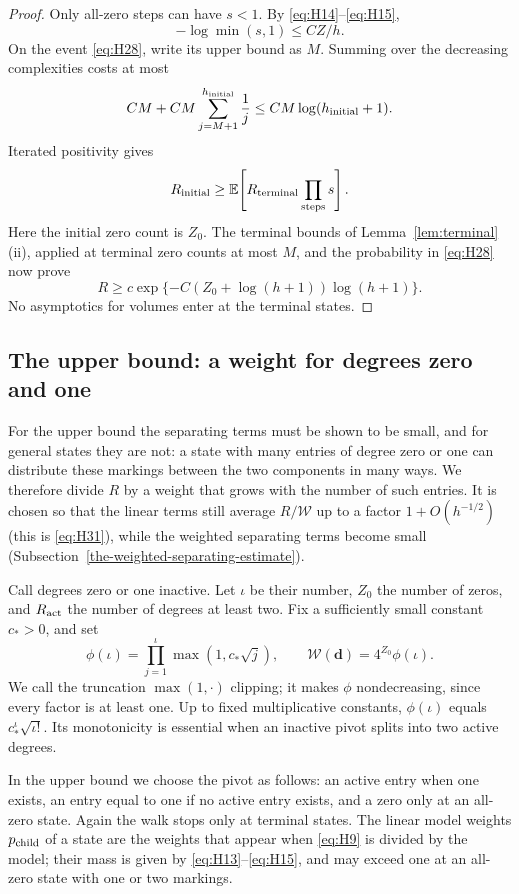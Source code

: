\begin{proof}
Only all-zero steps can have \(s<1\). By \eqref{eq:H14}--\eqref{eq:H15}, \[
-\log\min(s,1)\le CZ/h.
\] On the event \eqref{eq:H28}, write its upper bound as \(M\). Summing over the
decreasing complexities costs at most \[
CM+CM\sum_{j=M+1}^{h_{\rm initial}}\frac1j
\le CM\log(h_{\rm initial}+1).
\] Iterated positivity gives \[
R_{\rm initial}\ge
\mathbb E\!\left[R_{\rm terminal}\prod_{\rm steps}s\right].
\] Here the initial zero count is \(Z_0\). The terminal bounds of
Lemma~\ref{lem:terminal}(ii), applied at terminal zero counts at most
\(M\), and the probability in \eqref{eq:H28} now prove \begin{equation}
R\ge c\exp\{-C(Z_0+\log(h+1))\log(h+1)\}.\label{eq:H29}
\end{equation}
No asymptotics for volumes enter at the terminal states.
\end{proof}

\subsection{The upper bound: a weight for degrees zero and one}\label{upper-comparison-the-clipped-inactive-weight}

For the upper bound the separating terms must be shown to be small, and
for general states they are not: a state with many entries of degree zero
or one can distribute these markings between the two components in many
ways. We therefore divide \(R\) by a weight that grows with the number of
such entries. It is chosen so that the linear terms still average
\(R/\mathcal W\) up to a factor \(1+O(h^{-1/2})\) (this is \eqref{eq:H31}),
while the weighted separating terms become small
(Subsection~\ref{the-weighted-separating-estimate}).

Call degrees zero or one inactive. Let \(\iota\) be their number, \(Z_0\)
the number of zeros, and \(R_{\rm act}\) the number of degrees at least
two. Fix a sufficiently small constant \(c_*>0\), and set \begin{equation}
\phi(\iota)=\prod_{j=1}^\iota\max(1,c_*\sqrt j),\qquad
\mathcal W(\mathbf d)=4^{Z_0}\phi(\iota).
\label{eq:H30}
\end{equation} We call the truncation \(\max(1,\cdot)\) clipping; it makes
\(\phi\) nondecreasing, since every factor is at least one. Up to fixed
multiplicative constants, \(\phi(\iota)\) equals \(c_*^\iota\sqrt{\iota!}\). Its monotonicity is
essential when an inactive pivot splits into two active degrees.

In the upper bound we choose the pivot as follows: an active entry when
one exists, an entry equal to one if no active entry exists, and a zero
only at an all-zero state. Again the walk stops only at terminal states.
The linear model weights \(p_{\rm child}\) of a state are the weights
that appear when \eqref{eq:H9} is divided by the model; their mass is
given by \eqref{eq:H13}--\eqref{eq:H15}, and may exceed one at an
all-zero state with one or two markings.

